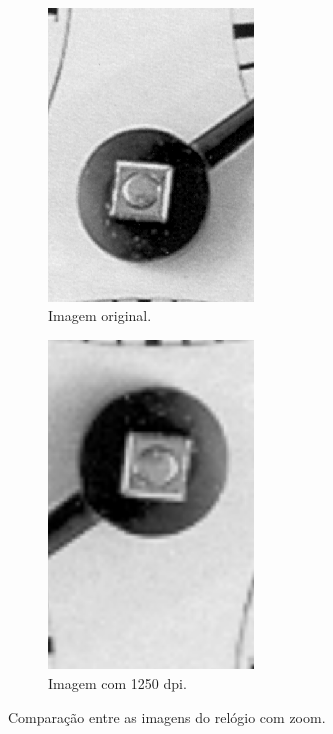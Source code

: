 \documentclass{article}
\begin{document}
\begin{figure}[H]
    \centering
        \begin{subfigure}[b]{0.45\textwidth}
            \includegraphics[width=0.6\textwidth]{figures/clock_original_zoom.tif.png}
            \caption{Imagem original.}
            \label{fig:clock_original_zoom}
        \end{subfigure}
        \begin{subfigure}[b]{0.45\textwidth}
            \includegraphics[width=0.6\textwidth, angle=180]{figures/clock_b_zoom.tif.png}
            \caption{Imagem com 1250 dpi.}
            \label{fig:clock_1250dpi_zoom}
        \end{subfigure}
        \caption{Comparação entre as imagens do relógio com zoom.}
        \label{fig:clock_zoom_comparison}
\end{figure}
\end{document}
